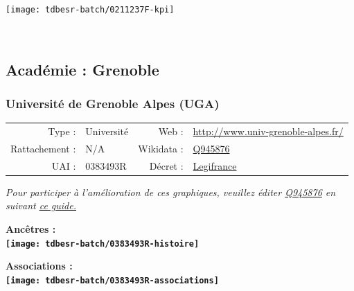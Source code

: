 \documentclass[12pt,french,]{article}
\begin{document}
\begin{center}\texttt{[image: tdbesr-batch/0211237F-kpi]} \end{center}\checkoddpage

\ifoddpage \fi ~\newpage  

\hypertarget{acaduxe9mie-grenoble}{%
\subsection{Académie : Grenoble}\label{acaduxe9mie-grenoble}}

\hypertarget{universituxe9-de-grenoble-alpes-uga}{%
\subsubsection{Université de Grenoble Alpes
(UGA)}\label{universituxe9-de-grenoble-alpes-uga}}

\begin{tabular*}{\textwidth}{rp{5cm}rl}  
\hline  
Type : & Université & Web : &\href{http://www.univ-grenoble-alpes.fr/}{http://www.univ-grenoble-alpes.fr/} \\  
Rattachement : & N/A & Wikidata : & \href{https://www.wikidata.org/entity/Q945876}{Q945876} \\  
UAI : & 0383493R & Décret : & \href{http://legifrance.gouv.fr/affichTexte.do?cidTexte=JORFTEXT000031147890&dateTexte=&categorieLien=id}{Legifrance} \\  
\hline  
\end{tabular*}

\textit{\scriptsize Pour participer à l'amélioration de ces graphiques, veuillez éditer  \href{https://www.wikidata.org/entity/Q945876}{Q945876}  en suivant \href{https://github.com/cpesr/wikidataESR/blob/master/Rmd/wikidataESR.md}{ce guide.}}

\vspace{1cm}  
\begin{minipage}[b]{0.50\textwidth}\begin{center} \bf Ancêtres : \\  
\texttt{[image: tdbesr-batch/0383493R-histoire]} \end{center}\end{minipage}\begin{minipage}[b]{0.50\textwidth}\begin{center} \bf Associations : \\  
\texttt{[image: tdbesr-batch/0383493R-associations]} \end{center}\end{minipage}
\end{document}
